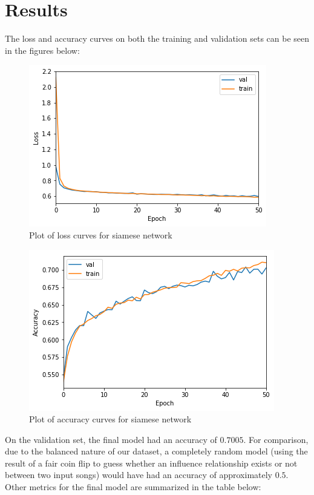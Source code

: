 \section{Results}
The loss and accuracy curves on both the training and validation sets can be seen in the figures below:

\begin{figure}[H]
\includegraphics[width=\textwidth]{figures/loss.png}
\caption{Plot of loss curves for siamese network}
\end{figure}

\begin{figure}[H]
\includegraphics[width=\textwidth]{figures/accuracy.png}
\caption{Plot of accuracy curves for siamese network}
\end{figure}

On the validation set, the final model had an accuracy of $0.7005$. For comparison, due to the balanced nature of our dataset, a completely random model (using the result of a fair coin flip to guess whether an influence relationship exists or not between two input songs) would have had an accuracy of approximately $0.5$. Other metrics for the final model are summarized in the table below:

